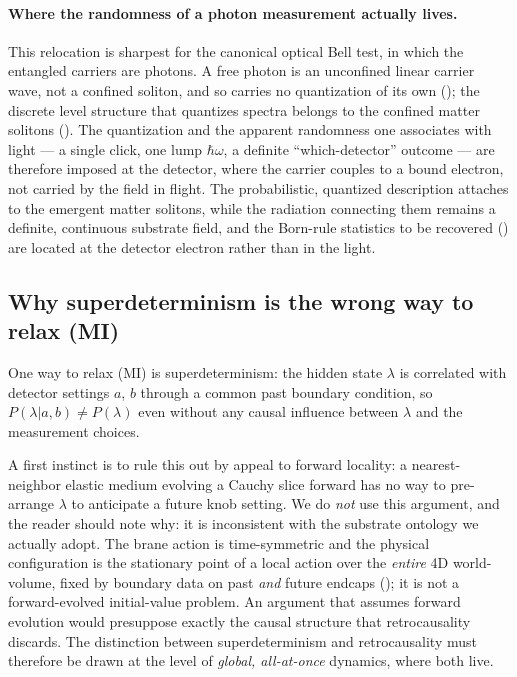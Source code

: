 \paragraph{Where the randomness of a photon measurement actually lives.}
This relocation is sharpest for the canonical optical Bell test, in which the entangled carriers
are photons. A free photon is an unconfined linear carrier wave, not a confined soliton, and so
carries no quantization of its own (); the discrete level structure that
quantizes spectra belongs to
the confined matter solitons (). The quantization and the apparent randomness one
associates with light --- a single click, one lump $\hbar\omega$, a definite ``which-detector''
outcome --- are therefore imposed at the detector, where the carrier couples to a bound electron,
not carried by the field in flight. The probabilistic, quantized description attaches to the
emergent matter solitons, while the radiation connecting them remains a definite, continuous
substrate field, and the Born-rule statistics to be recovered () are
located at the detector electron rather than in the light.

\subsection{Why superdeterminism is the wrong way to relax (MI)}
\label{subsec:no-superdeterminism}

One way to relax (MI) is superdeterminism: the hidden state $\lambda$ is correlated with
detector settings $a$, $b$ through a common past boundary condition, so $P(\lambda|a,b)\neq
P(\lambda)$ even without any causal influence between $\lambda$ and the measurement choices.

A first instinct is to rule this out by appeal to forward locality: a nearest-neighbor elastic
medium evolving a Cauchy slice forward has no way to pre-arrange $\lambda$ to anticipate a future
knob setting.
We do \emph{not} use this argument, and the reader should note why: it is inconsistent with the
substrate ontology we actually adopt.
The brane action is time-symmetric and the physical configuration is the stationary point of a
local action over the \emph{entire} 4D world-volume, fixed by boundary data on past \emph{and}
future endcaps (); it is not a forward-evolved initial-value problem.
An argument that assumes forward evolution would presuppose exactly the causal structure that
retrocausality discards.
The distinction between superdeterminism and retrocausality must therefore be drawn at the level
of \emph{global, all-at-once} dynamics, where both live.

